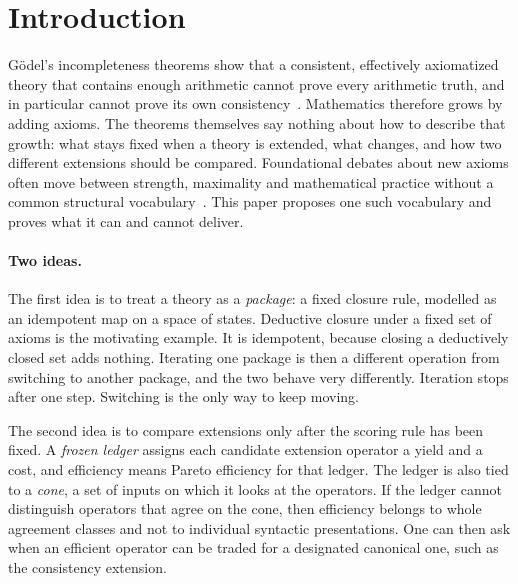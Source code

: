 \section{Introduction}\label{sec:introduction}

Gödel's incompleteness theorems show that a consistent, effectively axiomatized theory that contains enough arithmetic cannot prove every arithmetic truth, and in particular cannot prove its own consistency~\cite{Godel1931,HilbertBernays1939}. Mathematics therefore grows by adding axioms. The theorems themselves say nothing about how to describe that growth: what stays fixed when a theory is extended, what changes, and how two different extensions should be compared. Foundational debates about new axioms often move between strength, maximality and mathematical practice without a common structural vocabulary~\cite{Maddy1988,Maddy1997}. This paper proposes one such vocabulary and proves what it can and cannot deliver.

\paragraph{Two ideas.}
The first idea is to treat a theory as a \emph{package}: a fixed closure rule, modelled as an idempotent map on a space of states. Deductive closure under a fixed set of axioms is the motivating example. It is idempotent, because closing a deductively closed set adds nothing. Iterating one package is then a different operation from switching to another package, and the two behave very differently. Iteration stops after one step. Switching is the only way to keep moving.

The second idea is to compare extensions only after the scoring rule has been fixed. A \emph{frozen ledger} assigns each candidate extension operator a yield and a cost, and efficiency means Pareto efficiency for that ledger. The ledger is also tied to a \emph{cone}, a set of inputs on which it looks at the operators. If the ledger cannot distinguish operators that agree on the cone, then efficiency belongs to whole agreement classes and not to individual syntactic presentations. One can then ask when an efficient operator can be traded for a designated canonical one, such as the consistency extension.

